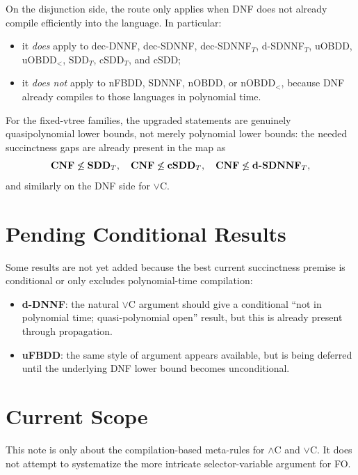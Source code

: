 \documentclass[11pt]{article}
\newcommand{\langref}[1]{\textbf{#1}}
\newcommand{\langfam}[2]{\textbf{#1$_{#2}$}}
\begin{document}
On the disjunction side, the route only applies when DNF does not already compile efficiently into the language.
In particular:
\begin{itemize}[noitemsep]
  \item it \emph{does} apply to dec-DNNF, dec-SDNNF, dec-SDNNF$_T$, d-SDNNF$_T$, uOBDD, uOBDD$_<$, SDD$_T$, cSDD$_T$, and cSDD;
  \item it \emph{does not} apply to nFBDD, SDNNF, nOBDD, or nOBDD$_<$, because DNF already compiles to those languages in polynomial time.
\end{itemize}

For the fixed-vtree families, the upgraded statements are genuinely quasipolynomial lower bounds, not merely polynomial lower bounds: the needed succinctness gaps are already present in the map as
\[
\langref{CNF} \not\leq \langfam{SDD}{T},\quad
\langref{CNF} \not\leq \langfam{cSDD}{T},\quad
\langref{CNF} \not\leq \langfam{d\mbox{-}SDNNF}{T},
\]
and similarly on the DNF side for $\lor$C.

\section{Pending Conditional Results}
Some results are not yet added because the best current succinctness premise is conditional or only excludes polynomial-time compilation:
\begin{itemize}[noitemsep]
  \item \langref{d-DNNF}: the natural $\lor$C argument should give a conditional ``not in polynomial time; quasi-polynomial open'' result, but this is already present through propagation.
  \item \langref{uFBDD}: the same style of argument appears available, but is being deferred until the underlying DNF lower bound becomes unconditional.
\end{itemize}

\section{Current Scope}
This note is only about the compilation-based meta-rules for $\land$C and $\lor$C.
It does not attempt to systematize the more intricate selector-variable argument for FO.



\end{document}
